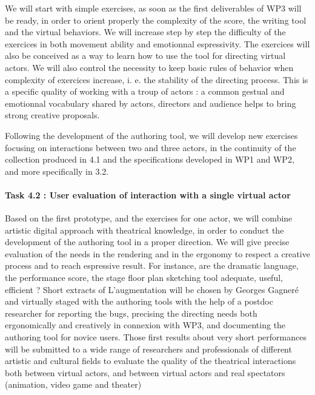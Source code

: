 
We will start with simple exercises, as soon as the first deliverables of WP3 will be ready, in order to orient properly the complexity of the score, the writing tool and the virtual behaviors. We will increase step by step the difficulty of the exercices in both movement ability and emotionnal espressivity. The exercices will also be conceived as a way to learn how to use the tool for directing virtual actors. We will also control the necessity to keep basic rules of behavior when complexity of exercices increase, i. e. the stability of the directing process. This is a specific quality of working with a troup of actors : a common gestual and emotionnal vocabulary shared by actors, directors and audience helps to bring strong creative proposals.  

Following the development of the authoring tool, we will develop new exercises focusing on interactions between two and three actors, in the continuity of the collection produced in 4.1 and the specifications developed in WP1 and WP2, and more specifically in 3.2. 


\paragraph{Task 4.2 : User evaluation of interaction with a single virtual actor}

Based on the first prototype, and the exercises for one actor, we will combine artistic digital approach with theatrical knowledge, in order to conduct the development of the authoring tool in a proper direction. We will give precise evaluation of the needs in the rendering and in the ergonomy to respect a creative process and to reach espressive result. For instance, are the dramatic language, the performance score, the stage floor plan sketching tool adequate, useful, efficient ? Short extracts of L'augmentation will be chosen by Georges Gagner\'e and virtually staged with the authoring tools with the help of a postdoc researcher for reporting the bugs, precising the directing needs both ergonomically and creatively in connexion with WP3,  and documenting the authoring tool for novice   users.  Those first results about very short performances will be submitted to a wide range of researchers and professionals of different artistic and cultural fields to evaluate the quality of the theatrical interactions 
both between virtual actors, and between virtual actors and real spectators (animation, video game and theater)  


